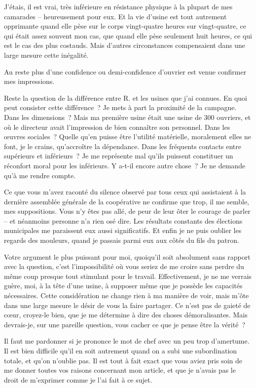 \documentclass[french,twoside]{book} %
\begin{document}
J'étais, il est vrai, très inférieure en résistance physique à la plupart de mes camarades – heureusement pour eux. Et la vie d'usine est tout autrement opprimante quand elle pèse sur le corps vingt-quatre heures sur vingt-quatre, ce qui était assez souvent mon cas, que quand elle pèse seulement huit heures, ce qui est le cas des plus costauds. Mais d'autres circonstances compensaient dans une large mesure cette inégalité.\par
Au reste plus d'une confidence ou demi-confidence d'ouvrier est venue confirmer mes impressions.\par
Reste la question de la différence entre R. et les usines que j'ai connues. En quoi peut consister cette différence ? Je mets à part la proximité de la campagne. Dans les dimensions ? Mais ma première usine était une usine de 300 ouvriers, et où le directeur avait l'impression de bien connaître son personnel. Dans les œuvres sociales ? Quelle qu'en puisse être l'utilité matérielle, moralement elles ne font, je le crains, qu'accroître la dépendance. Dans les fréquents contacts entre supérieurs et inférieurs ? Je me représente mal qu'ils puissent constituer un réconfort moral pour les inférieurs. Y a-t-il encore autre chose ? Je ne demande qu'à me rendre compte.\par
Ce que vous m'avez raconté du silence observé par tous ceux qui assistaient à la dernière assemblée générale de la coopérative ne confirme que trop, il me semble, mes suppositions. Vous n'y êtes pas allé, de peur de leur ôter le courage de parler – et néanmoins personne n'a rien osé dire. Les résultats constants des élections municipales me paraissent eux aussi significatifs. Et enfin je ne puis oublier les regards des mouleurs, quand je passais parmi eux aux côtés du fils du patron.\par
Votre argument le plus puissant pour moi, quoiqu'il soit absolument sans rapport avec la question, c'est l'impossibilité où vous seriez de me croire sans perdre du même coup presque tout stimulant pour le travail. Effectivement, je ne me verrais guère, moi, à la tête d'une usine, à supposer même que je possède les capacités nécessaires. Cette considération ne change rien à ma manière de voir, mais m'ôte dans une large mesure le désir de vous la faire partager. Ce n'est pas de gaieté de cœur, croyez-le bien, que je me détermine à dire des choses démoralisantes. Mais devrais-je, sur une pareille question, vous cacher ce que je pense être la vérité ?\par
Il faut me pardonner si je prononce le mot de chef avec un peu trop d'amertume. Il est bien difficile qu'il en soit autrement quand on a subi une subordination totale, et qu'on n'oublie pas. Il est tout à fait exact que vous aviez pris soin de me donner toutes vos raisons concernant mon article, et que je n'avais pas le droit de m'exprimer comme je l'ai fait à ce sujet.\par
\end{document}
